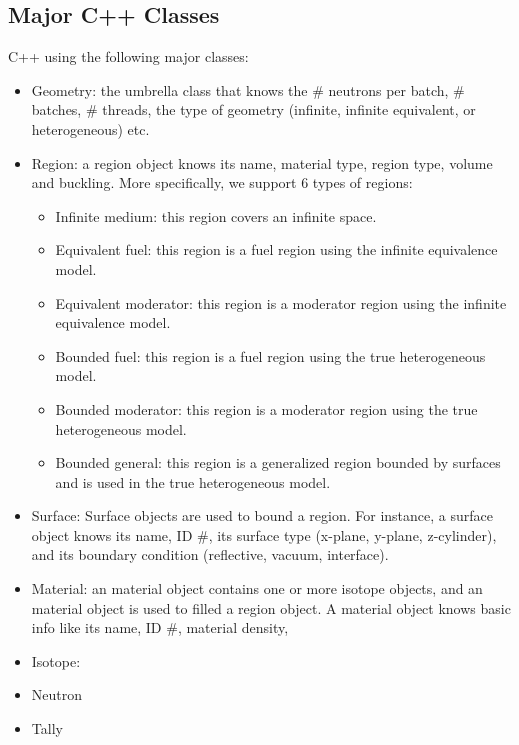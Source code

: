 \documentclass[titlepage]{article}
\begin{document}
\subsection{Major C++ Classes}
C++ using the following major classes: 
\begin{itemize}
\item Geometry: the umbrella class that knows the \# neutrons per batch, \# batches, \# threads, the type of geometry (infinite, infinite equivalent, or heterogeneous) etc. 
\item Region: a region object knows its name, material type, region type, volume and buckling. More specifically, we support 6 types of regions: 
  \begin{itemize}
    \item Infinite medium: this region covers an infinite space. 
    \item Equivalent fuel: this region is a fuel region using the infinite equivalence model. 
    \item Equivalent moderator: this region is a moderator region using the infinite equivalence model. 
    \item Bounded fuel: this region is a fuel region using the true heterogeneous model. 
    \item Bounded moderator: this region is a moderator region using the true heterogeneous model. 
    \item Bounded general: this region is a generalized region bounded by surfaces and is used in the true heterogeneous model. 
  \end{itemize}

\item Surface: Surface objects are used to bound a region. For instance, a surface object knows its name, ID \#, its surface type (x-plane, y-plane, z-cylinder), and its boundary condition (reflective, vacuum, interface). 

\item Material: an material object contains one or more isotope objects, and an material object is used to filled a region object. A material object knows basic info like its name, ID \#, material density, 


\item Isotope:

\item Neutron

\item Tally
\end{itemize}

\clearpage
\end{document}
